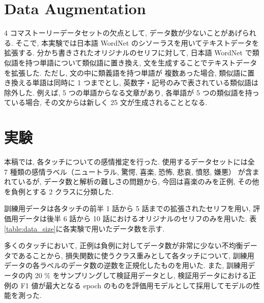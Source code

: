 \documentclass[twocolumn]{jarticle}     %
\begin{document}
\section{Data Augmentation}
4 コマストーリーデータセットの欠点として, データ数が少ないことがあげられる. そこで, 本実験では日本語 WordNet \cite{word_net_jp} のシソーラスを用いてテキストデータを拡張する.
分かち書きされたオリジナルのセリフに対して, 日本語 WordNet で類似語を持つ単語について類似語に置き換え, 文を生成することでテキストデータを拡張した. ただし, 文の中に類義語を持つ単語が
複数あった場合, 類似語に置き換える単語は同時に 1 つまでとし, 英数字・記号のみで表されている類似語は除外した. 例えば, 5 つの単語からなる文章があり,
各単語が 5 つの類似語を持っている場合, その文からは新しく 25 文が生成されることとなる.

\section{実験}
本稿では, 各タッチについての感情推定を行った.
使用するデータセットには全 7 種類の感情ラベル（ニュートラル, 驚愕, 喜楽, 恐怖, 悲哀, 憤怒, 嫌悪）
が含まれているが, データ数と解析の難しさの問題から, 今回は喜楽のみを正例, その他を負例とする 2 クラスに分類した.

訓練用データは各タッチの前半 1 話から 5 話までの拡張されたセリフを用い,
評価用データは後半 6 話から 10 話におけるオリジナルのセリフのみを用いた.
表\ref{table:data_size}に各実験で用いたデータ数を示す.

多くのタッチにおいて, 正例は負例に対してデータ数が非常に少ない不均衡データであることから, 損失関数に使うクラス重みとして各タッチについて, 訓練用データの各ラベルのデータ数の逆数を正規化したものを用いた. また, 訓練用データの内 20 \% をサンプリングして検証用データとし, 検証用データにおける正例の F1 値が最大となる epoch のものを評価用モデルとして採用してモデルの性能を測った.
\end{document}
